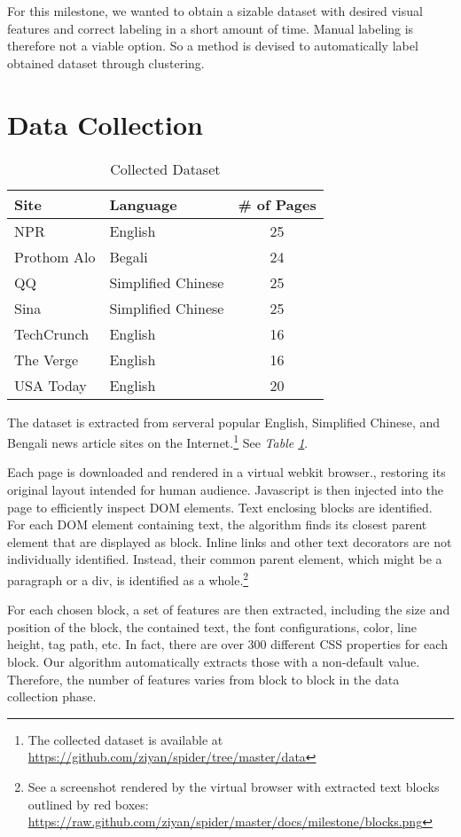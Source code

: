 \documentclass{acm_proc_article-sp}
\begin{document}
For this milestone, we wanted to obtain a sizable dataset with desired visual features and correct labeling in a short amount of time. Manual labeling is therefore not a viable option. So a method is devised to automatically label obtained dataset through clustering.

\section{Data Collection}

\begin{table}
\centering
\caption{\label{table:dataset}Collected Dataset}
\begin{tabular}{|l|l|c|} \hline
Site&Language&\# of Pages\\ \hline\hline
NPR&English&25\\ \hline
Prothom Alo&Begali&24\\ \hline
QQ&Simplified Chinese&25\\ \hline
Sina&Simplified Chinese&25\\ \hline
TechCrunch&English&16\\ \hline
The Verge&English&16\\ \hline
USA Today&English&20\\ \hline
\end{tabular}
\end{table}

The dataset is extracted from serveral popular English, Simplified Chinese, and Bengali news article sites on the Internet.\footnote{The collected dataset is available at \url{https://github.com/ziyan/spider/tree/master/data}} See \emph{Table \ref{table:dataset}}.

Each page is downloaded and rendered in a virtual webkit browser.\cite{phantomjs}, restoring its original layout intended for human audience. Javascript is then injected into the page to efficiently inspect DOM elements. Text enclosing blocks are identified. For each DOM element containing text, the algorithm finds its closest parent element that are displayed as block. Inline links and other text decorators are not individually identified. Instead, their common parent element, which might be a paragraph or a div, is identified as a whole.\footnote{See a screenshot rendered by the virtual browser with extracted text blocks outlined by red boxes: \url{https://raw.github.com/ziyan/spider/master/docs/milestone/blocks.png}}

For each chosen block, a set of features are then extracted, including the size and position of the block, the contained text, the font configurations, color, line height, tag path, etc. In fact, there are over 300 different CSS properties for each block. Our algorithm automatically extracts those with a non-default value. Therefore, the number of features varies from block to block in the data collection phase.
\end{document}
